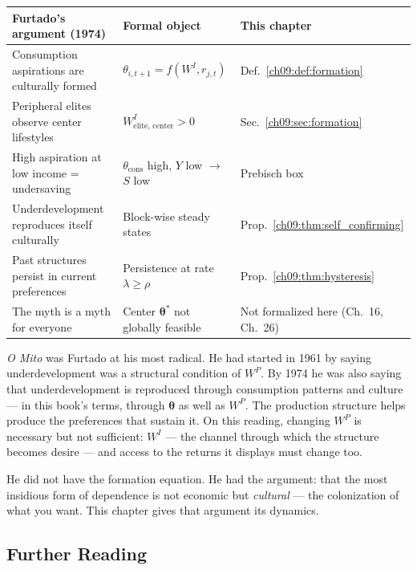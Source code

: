 \documentclass[../structural_economics_book.tex]{subfiles}
\begin{document}
\begin{center}
\begin{tabularx}{\textwidth}{LLL}
\toprule
\textbf{Furtado's argument (1974)} & \textbf{Formal object} & \textbf{This chapter} \\
\midrule
Consumption aspirations are culturally formed & $\theta_{i,t+1} = f(W^I, r_{j,t})$ & Def.~\ref{ch09:def:formation} \\
Peripheral elites observe center lifestyles & $W^I_{\text{elite, center}} > 0$ & Sec.~\ref{ch09:sec:formation} \\
High aspiration at low income = undersaving & $\theta_{\text{cons}}$ high, $Y$ low $\to$ $S$ low & Prebisch box \\
Underdevelopment reproduces itself culturally & Block-wise steady states & Prop.~\ref{ch09:thm:self_confirming} \\
Past structures persist in current preferences & Persistence at rate $\lambda \geq \rho$ & Prop.~\ref{ch09:thm:hysteresis} \\
The myth is a myth for everyone & Center $\boldsymbol{\theta}^*$ not globally feasible & Not formalized here (Ch.~16, Ch.~26) \\
\bottomrule
\end{tabularx}
\end{center}

\textit{O Mito} was Furtado at his most radical. He had started in 1961 by saying underdevelopment was a structural condition of $W^P$. By 1974 he was also saying that underdevelopment is reproduced through consumption patterns and culture --- in this book's terms, through $\boldsymbol{\theta}$ as well as $W^P$. The production structure helps produce the preferences that sustain it. On this reading, changing $W^P$ is necessary but not sufficient: $W^I$ --- the channel through which the structure becomes desire --- and access to the returns it displays must change too.

He did not have the formation equation. He had the argument: that the most insidious form of dependence is not economic but \textit{cultural} --- the colonization of what you want. This chapter gives that argument its dynamics.


\subsection*{Further Reading}
\end{document}
